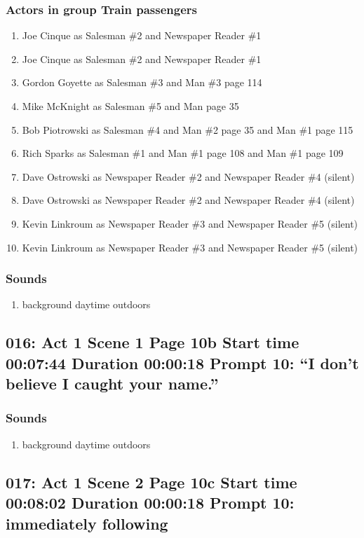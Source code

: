 \subsubsection{Actors in group Train passengers}
\begin{enumerate}
\item Joe Cinque as Salesman \#2 and Newspaper Reader \#1
\item Joe Cinque as Salesman \#2 and Newspaper Reader \#1
\item Gordon Goyette as Salesman \#3 and Man \#3 page 114
\item Mike McKnight as Salesman \#5 and Man page 35
\item Bob Piotrowski as Salesman \#4 and Man \#2 page 35 and Man \#1 page 115
\item Rich Sparks as Salesman \#1 and Man \#1 page 108 and Man \#1 page 109
\item Dave Ostrowski as Newspaper Reader \#2 and Newspaper Reader \#4 (silent)
\item Dave Ostrowski as Newspaper Reader \#2 and Newspaper Reader \#4 (silent)
\item Kevin Linkroum as Newspaper Reader \#3 and Newspaper Reader \#5 (silent)
\item Kevin Linkroum as Newspaper Reader \#3 and Newspaper Reader \#5 (silent)
\end{enumerate}

\subsubsection{Sounds}
\begin{enumerate}
\item background daytime outdoors
\end{enumerate}
\subsection{016: Act 1 Scene 1 Page 10b Start time 00:07:44 Duration 00:00:18 Prompt 10: ``I don't believe I caught your name.''}
\subsubsection{Sounds}
\begin{enumerate}
\item background daytime outdoors
\end{enumerate}
\subsection{017: Act 1 Scene 2 Page 10c Start time 00:08:02 Duration 00:00:18 Prompt 10: immediately following}

